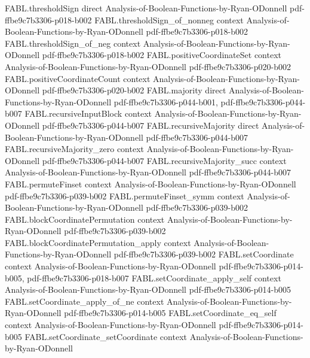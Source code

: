 \begin{theorem}
\proofstep
  {FABL.thresholdSign}
  {direct}
  {Analysis-of-Boolean-Functions-by-Ryan-ODonnell}
  {pdf-ffbe9c7b3306-p018-b002}
\proofstep
  {FABL.thresholdSign_of_nonneg}
  {context}
  {Analysis-of-Boolean-Functions-by-Ryan-ODonnell}
  {pdf-ffbe9c7b3306-p018-b002}
\proofstep
  {FABL.thresholdSign_of_neg}
  {context}
  {Analysis-of-Boolean-Functions-by-Ryan-ODonnell}
  {pdf-ffbe9c7b3306-p018-b002}
\proofstep
  {FABL.positiveCoordinateSet}
  {context}
  {Analysis-of-Boolean-Functions-by-Ryan-ODonnell}
  {pdf-ffbe9c7b3306-p020-b002}
\proofstep
  {FABL.positiveCoordinateCount}
  {context}
  {Analysis-of-Boolean-Functions-by-Ryan-ODonnell}
  {pdf-ffbe9c7b3306-p020-b002}
\proofstep
  {FABL.majority}
  {direct}
  {Analysis-of-Boolean-Functions-by-Ryan-ODonnell}
  {pdf-ffbe9c7b3306-p044-b001,
    pdf-ffbe9c7b3306-p044-b007}
\proofstep
  {FABL.recursiveInputBlock}
  {context}
  {Analysis-of-Boolean-Functions-by-Ryan-ODonnell}
  {pdf-ffbe9c7b3306-p044-b007}
\proofstep
  {FABL.recursiveMajority}
  {direct}
  {Analysis-of-Boolean-Functions-by-Ryan-ODonnell}
  {pdf-ffbe9c7b3306-p044-b007}
\proofstep
  {FABL.recursiveMajority_zero}
  {context}
  {Analysis-of-Boolean-Functions-by-Ryan-ODonnell}
  {pdf-ffbe9c7b3306-p044-b007}
\proofstep
  {FABL.recursiveMajority_succ}
  {context}
  {Analysis-of-Boolean-Functions-by-Ryan-ODonnell}
  {pdf-ffbe9c7b3306-p044-b007}
\proofstep
  {FABL.permuteFinset}
  {context}
  {Analysis-of-Boolean-Functions-by-Ryan-ODonnell}
  {pdf-ffbe9c7b3306-p039-b002}
\proofstep
  {FABL.permuteFinset_symm}
  {context}
  {Analysis-of-Boolean-Functions-by-Ryan-ODonnell}
  {pdf-ffbe9c7b3306-p039-b002}
\proofstep
  {FABL.blockCoordinatePermutation}
  {context}
  {Analysis-of-Boolean-Functions-by-Ryan-ODonnell}
  {pdf-ffbe9c7b3306-p039-b002}
\proofstep
  {FABL.blockCoordinatePermutation_apply}
  {context}
  {Analysis-of-Boolean-Functions-by-Ryan-ODonnell}
  {pdf-ffbe9c7b3306-p039-b002}
\proofstep
  {FABL.setCoordinate}
  {context}
  {Analysis-of-Boolean-Functions-by-Ryan-ODonnell}
  {pdf-ffbe9c7b3306-p014-b005,
    pdf-ffbe9c7b3306-p018-b007}
\proofstep
  {FABL.setCoordinate_apply_self}
  {context}
  {Analysis-of-Boolean-Functions-by-Ryan-ODonnell}
  {pdf-ffbe9c7b3306-p014-b005}
\proofstep
  {FABL.setCoordinate_apply_of_ne}
  {context}
  {Analysis-of-Boolean-Functions-by-Ryan-ODonnell}
  {pdf-ffbe9c7b3306-p014-b005}
\proofstep
  {FABL.setCoordinate_eq_self}
  {context}
  {Analysis-of-Boolean-Functions-by-Ryan-ODonnell}
  {pdf-ffbe9c7b3306-p014-b005}
\proofstep
  {FABL.setCoordinate_setCoordinate}
  {context}
  {Analysis-of-Boolean-Functions-by-Ryan-ODonnell}

\end{theorem}

